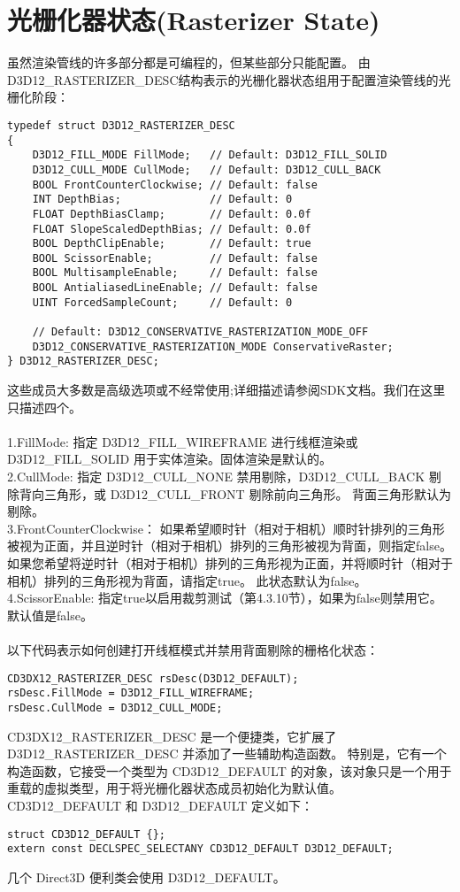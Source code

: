 \section{光栅化器状态(Rasterizer State)}
\begin{flushleft}
虽然渲染管线的许多部分都是可编程的，但某些部分只能配置。 由D3D12\_RASTERIZER\_DESC结构表示的光栅化器状态组用于配置渲染管线的光栅化阶段：\\
\begin{lstlisting}
typedef struct D3D12_RASTERIZER_DESC
{
    D3D12_FILL_MODE FillMode;   // Default: D3D12_FILL_SOLID
    D3D12_CULL_MODE CullMode;   // Default: D3D12_CULL_BACK
    BOOL FrontCounterClockwise; // Default: false
    INT DepthBias;              // Default: 0
    FLOAT DepthBiasClamp;       // Default: 0.0f
    FLOAT SlopeScaledDepthBias; // Default: 0.0f
    BOOL DepthClipEnable;       // Default: true
    BOOL ScissorEnable;         // Default: false
    BOOL MultisampleEnable;     // Default: false
    BOOL AntialiasedLineEnable; // Default: false
    UINT ForcedSampleCount;     // Default: 0

    // Default: D3D12_CONSERVATIVE_RASTERIZATION_MODE_OFF
    D3D12_CONSERVATIVE_RASTERIZATION_MODE ConservativeRaster;
} D3D12_RASTERIZER_DESC;
\end{lstlisting}
这些成员大多数是高级选项或不经常使用;详细描述请参阅SDK文档。我们在这里只描述四个。\\
~\\
1.FillMode: 指定 D3D12\_FILL\_WIREFRAME 进行线框渲染或 D3D12\_FILL\_SOLID 用于实体渲染。固体渲染是默认的。\\
2.CullMode: 指定 D3D12\_CULL\_NONE 禁用剔除，D3D12\_CULL\_BACK 剔除背向三角形，或 D3D12\_CULL\_FRONT 剔除前向三角形。 背面三角形默认为剔除。\\
3.FrontCounterClockwise： 如果希望顺时针（相对于相机）顺时针排列的三角形被视为正面，并且逆时针（相对于相机）排列的三角形被视为背面，则指定false。 如果您希望将逆时针（相对于相机）排列的三角形视为正面，并将顺时针（相对于相机）排列的三角形视为背面，请指定true。 此状态默认为false。\\
4.ScissorEnable: 指定true以启用裁剪测试（第4.3.10节），如果为false则禁用它。 默认值是false。\\
~\\
以下代码表示如何创建打开线框模式并禁用背面剔除的栅格化状态：\\
\begin{lstlisting}
CD3DX12_RASTERIZER_DESC rsDesc(D3D12_DEFAULT);
rsDesc.FillMode = D3D12_FILL_WIREFRAME;
rsDesc.CullMode = D3D12_CULL_MODE;
\end{lstlisting}
CD3DX12\_RASTERIZER\_DESC 是一个便捷类，它扩展了 D3D12\_RASTERIZER\_DESC 并添加了一些辅助构造函数。 特别是，它有一个构造函数，它接受一个类型为 CD3D12\_DEFAULT 的对象，该对象只是一个用于重载的虚拟类型，用于将光栅化器状态成员初始化为默认值。CD3D12\_DEFAULT 和 D3D12\_DEFAULT 定义如下：\\
\begin{lstlisting}
struct CD3D12_DEFAULT {};
extern const DECLSPEC_SELECTANY CD3D12_DEFAULT D3D12_DEFAULT;
\end{lstlisting}
几个 Direct3D 便利类会使用 D3D12\_DEFAULT。
\end{flushleft}

